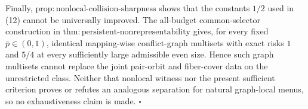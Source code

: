 Finally, \(\mathrm{prop{:}nonlocal\text{-}collision\text{-}sharpness}\) shows that the constants \(1/2\) used in (12) cannot be universally improved.  The all-budget common-selector construction in \(\mathrm{thm{:}persistent\text{-}nonrepresentability}\) gives, for every fixed \(\bar p\in(0,1)\), identical mapping-wise conflict-graph multisets with exact risks \(1\) and \(5/4\) at every sufficiently large admissible even size.  Hence such graph multisets cannot replace the joint pair-orbit and fiber-cover data on the unrestricted class.  Neither that nonlocal witness nor the present sufficient criterion proves or refutes an analogous separation for natural graph-local menus, so no exhaustiveness claim is made. \(\square\)